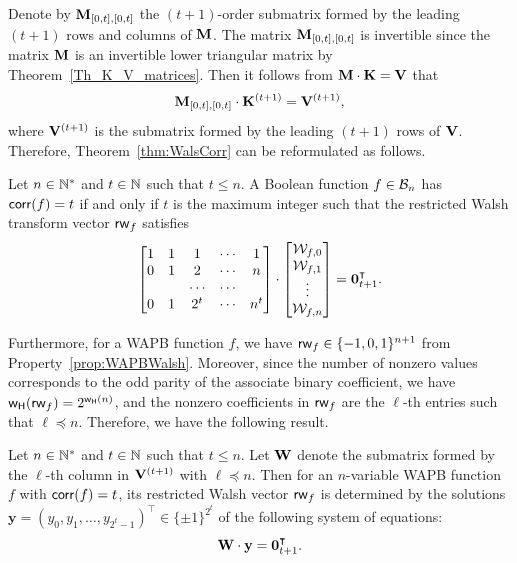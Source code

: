 \documentclass[11pt]{llncs}
\begin{document}
Denote by $\mathbf{M}_{[0,t],[0,t]}$ the $(t+1)$-order submatrix formed by the leading $(t+1)$ rows and columns of $\mathbf{M}$.
The matrix $\mathbf{M}_{[0,t],[0,t]}$ is invertible since the matrix $\mathbf{M}$ is an invertible lower triangular matrix by Theorem~\ref{Th_K_V_matrices}.
Then it follows from $\mathbf{M} \cdot \mathbf{K} = \mathbf{V}$ that
\[
\mathbf{M}_{[0,t],[0,t]} \cdot \mathbf{K}^{(t+1)} = \mathbf{V}^{(t+1)},
\]where $\mathbf{V}^{(t+1)}$ is the submatrix formed by the leading $(t+1)$ rows of $\mathbf{V}$.
Therefore, Theorem~\ref{thm:WalsCorr} can be reformulated as follows.

\begin{theorem}\label{thm:t_corrector_Vandemonde_matrix}
	Let $n\in \mathbb{N}^*$ and $t\in \mathbb{N}$ such that $t\le n$.
	A Boolean function $f\in \mathcal{B}_{n}$ has $\mathsf{corr}(f) = t$ if and only if $t$ is the maximum integer such that the restricted Walsh transform vector $\mathsf{rw}_{f}$ satisfies
\begin{equation}\label{Eq_RWT}
 \begin{bmatrix}
1 & 1 & 1 & \cdots & 1 \\
0 & 1 & 2 & \cdots & n \\
&  &  \cdots &\cdots &  \\
0 & 1 & 2^{t} & \cdots & n^{t}
\end{bmatrix}\cdot
\begin{bmatrix}
\mathcal{W}_{f,0} \\ \mathcal{W}_{f,1} \\ \vdots \\ \mathcal{W}_{f,n}
\end{bmatrix} = \textbf{0}_{t+1}^\intercal.
\end{equation}
\end{theorem}

Furthermore, for a WAPB function $f$, we have $\mathsf{rw}_{f}\in \{-1,0,1\}^{n+1}$ from Property~\ref{prop:WAPBWalsh}. Moreover, since the number of nonzero values corresponds to the odd parity of the associate binary coefficient, we have $\mathsf{w_H}(\mathsf{rw}_{f})=2^{\mathsf{w_H}(n)}$, and the nonzero coefficients in $\mathsf{rw}_{f}$ are the $\ell$-th entries such that $\ell\preceq n$.
Therefore, we have the following result.

\begin{corollary}\label{Th-corrector-by-Vandemonde}
		Let $n\in \mathbb{N}^*$ and $t\in \mathbb{N}$ such that $t\le n$.
	Let $\mathbf{W}$ denote the submatrix formed by the $\ell$-th column in $\mathbf{V}^{(t+1)}$ with $\ell \preceq n$.
	Then for an $n$-variable WAPB function $f$ with $\mathsf{corr}(f)=t$, its restricted Walsh vector $\mathsf{rw}_{f}$
	is determined by the solutions $\mathbf{y}=(y_0,y_1,\dots, y_{2^t-1})^\intercal \in \{\pm 1\}^{2^t}$ of the following
	system of equations:
	\[
	\mathbf{W} \cdot \mathbf{y} = \mathbf{0}_{{t+1}}^{\intercal}.
	\]
\end{corollary}
\end{document}

